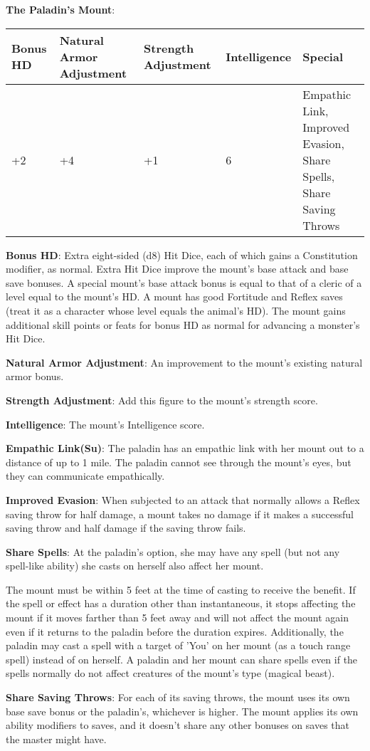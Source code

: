 \textbf{The Paladin's Mount}:

\begin{center}
\begin{adjustwidth}{-4cm}{}
\begin{small}
\begin{tabular}{| l | l | l | l | l |}
\hline
Bonus HD &Natural Armor Adjustment &Strength Adjustment &Intelligence &Special \\
\hline
+2 &+4 &+1 &6 &\makecell{Empathic Link, Improved Evasion,\\ Share Spells, Share Saving Throws} \\
\hline
\end{tabular}
\end{small}
\end{adjustwidth}
\end{center}

\textbf{Bonus HD}: Extra eight-sided (d8) Hit Dice, each of which gains a Constitution modifier, as normal. Extra Hit Dice improve the mount's base attack and base save bonuses. A special mount's base attack bonus is equal to that of a cleric of a level equal to the mount's HD. A mount has good Fortitude and Reflex saves (treat it as a character whose level equals the animal's HD). The mount gains additional skill points or feats for bonus HD as normal for advancing a monster's Hit Dice.

\textbf{Natural Armor Adjustment}: An improvement to the mount's existing natural armor bonus.

\textbf{Strength Adjustment}: Add this figure to the mount's strength score.

\textbf{Intelligence}: The mount's Intelligence score.

\textbf{Empathic Link(Su)}: The paladin has an empathic link with her mount out to a distance of up to 1 mile. The paladin cannot see through the mount's eyes, but they can communicate empathically.

\textbf{Improved Evasion}: When subjected to an attack that normally allows a Reflex saving throw for half damage, a mount takes no damage if it makes a successful saving throw and half damage if the saving throw fails.

\textbf{Share Spells}: At the paladin's option, she may have any spell (but not any spell-like ability) she casts on herself also affect her mount.

The mount must be within 5 feet at the time of casting to receive the benefit. If the spell or effect has a duration other than instantaneous, it stops affecting the mount if it moves farther than 5 feet away and will not affect the mount again even if it returns to the paladin before the duration expires. Additionally, the paladin may cast a spell with a target of 'You' on her mount (as a touch range spell) instead of on herself. A paladin and her mount can share spells even if the spells normally do not affect creatures of the mount's type (magical beast).

\textbf{Share Saving Throws}: For each of its saving throws, the mount uses its own base save bonus or the paladin's, whichever is higher. The mount applies its own ability modifiers to saves, and it doesn't share any other bonuses on saves that the master might have.